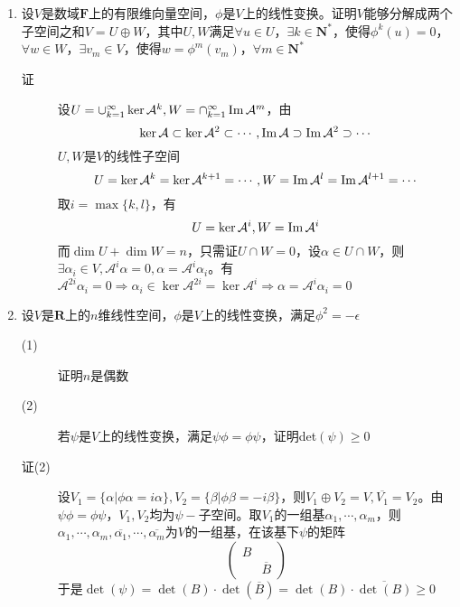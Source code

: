 \begin{enumerate}
\item 设$V$是数域$\mathbf{F}$上的有限维向量空间，$\phi$是$V$上的线性变换。证明$V$能够分解成两个子空间之和$V=U\oplus W$，其中$U,W$满足$\forall u\in U$，$\exists k\in\mathbf{N}^*$，使得$\phi^k(u)=0$，$\forall w\in W$，$\exists v_m\in V$，使得$w=\phi^m(v_m)$，$\forall m\in\mathbf{N}^*$
\begin{description}
\item[证] 设$U=\cup_{k=1}^\infty \ker\mathcal{A}^k,W=\cap_{k=1}^\infty \operatorname{Im}\mathcal{A}^m$，由
\[
\ker\mathcal{A} \subset \ker\mathcal{A}^2 \subset \cdots,\operatorname{Im}\mathcal{A}\supset \operatorname{Im}\mathcal{A}^2 \supset \cdots
\]
$U,W$是$V$的线性子空间
\[
U = \ker\mathcal{A}^k = \ker\mathcal{A}^{k+1} = \cdots, W = \operatorname{Im}\mathcal{A}^l = \operatorname{Im}\mathcal{A}^{l+1} = \cdots
\]
取$i = \max \{k,l\}$，有
\[
U = \ker\mathcal{A}^i,W = \operatorname{Im}\mathcal{A}^i
\]
而$\dim U+\dim W=n$，只需证$U \cap W = 0$，设$\alpha \in U \cap W $，则$\exists \alpha_i \in V,\mathcal{A}^i\alpha =0,\alpha=\mathcal{A}^i\alpha_i$。有$\mathcal{A}^{2i}\alpha_i=0\Rightarrow \alpha_i \in\ker\mathcal{A}^{2i}=\ker\mathcal{A}^i \Rightarrow \alpha = \mathcal{A}^i \alpha_i = 0 $
\end{description}

\item 设$V$是$\mathbf{R}$上的$n$维线性空间，$\phi$是$V$上的线性变换，满足$\phi^2=-\epsilon$
\begin{description}
\item[(1)] 证明$n$是偶数
\item[(2)] 若$\psi$是$V$上的线性变换，满足$\psi\phi=\phi\psi$，证明det$(\psi)\geq 0$
\item[证(2)] 设$V_1=\{\alpha |\phi \alpha = i\alpha\},V_2=\{\beta |\phi \beta = -i\beta\}$，则$V_1\oplus V_2=V,\overline{V_1}=V_2$。由$\psi\phi=\phi\psi$，$V_1,V_2$均为$\psi-$子空间。取$V_1$的一组基$\alpha_1,\cdots,\alpha_m$，则$\alpha_1,\cdots,\alpha_m,\overline{\alpha_1},\cdots,\overline{\alpha_m}$为$V$的一组基，在该基下$\psi$的矩阵
\[
\left(
\begin{array}{cc}
B & \\
 & \overline{B}
\end{array} \right)
\]
于是$\det(\psi)=\det(B)\cdot\det(\overline{B}) = \det(B)\cdot \overline{\det(B)} \geq 0$
\end{description}

















\end{enumerate}
